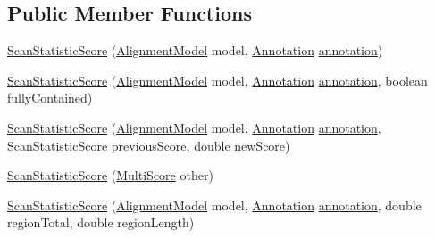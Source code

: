 \subsection*{Public Member Functions}
\begin{DoxyCompactItemize}
\item 
\hyperlink{classumms_1_1core_1_1model_1_1score_1_1_scan_statistic_score_aa144af17481662d4c3e8b2e562b1b91b}{Scan\+Statistic\+Score} (\hyperlink{classumms_1_1core_1_1model_1_1_alignment_model}{Alignment\+Model} model, \hyperlink{interfaceumms_1_1core_1_1annotation_1_1_annotation}{Annotation} \hyperlink{classumms_1_1core_1_1model_1_1score_1_1_window_score_1_1_abstract_window_score_a455fb02f18f492e611113b9da0a24888}{annotation})
\item 
\hyperlink{classumms_1_1core_1_1model_1_1score_1_1_scan_statistic_score_a2ce362a90f26940470dc5341a904265e}{Scan\+Statistic\+Score} (\hyperlink{classumms_1_1core_1_1model_1_1_alignment_model}{Alignment\+Model} model, \hyperlink{interfaceumms_1_1core_1_1annotation_1_1_annotation}{Annotation} \hyperlink{classumms_1_1core_1_1model_1_1score_1_1_window_score_1_1_abstract_window_score_a455fb02f18f492e611113b9da0a24888}{annotation}, boolean fully\+Contained)
\item 
\hyperlink{classumms_1_1core_1_1model_1_1score_1_1_scan_statistic_score_a9b1cdb78a8514b350e3d90302114cb6c}{Scan\+Statistic\+Score} (\hyperlink{classumms_1_1core_1_1model_1_1_alignment_model}{Alignment\+Model} model, \hyperlink{interfaceumms_1_1core_1_1annotation_1_1_annotation}{Annotation} \hyperlink{classumms_1_1core_1_1model_1_1score_1_1_window_score_1_1_abstract_window_score_a455fb02f18f492e611113b9da0a24888}{annotation}, \hyperlink{classumms_1_1core_1_1model_1_1score_1_1_scan_statistic_score}{Scan\+Statistic\+Score} previous\+Score, double new\+Score)
\item 
\hyperlink{classumms_1_1core_1_1model_1_1score_1_1_scan_statistic_score_a2395419532a1aad94301d88ec0f98122}{Scan\+Statistic\+Score} (\hyperlink{classumms_1_1core_1_1model_1_1score_1_1_multi_score}{Multi\+Score} other)
\item 
\hyperlink{classumms_1_1core_1_1model_1_1score_1_1_scan_statistic_score_a3b8f9c31d40e3bc174a3c8f2b04c8d07}{Scan\+Statistic\+Score} (\hyperlink{classumms_1_1core_1_1model_1_1_alignment_model}{Alignment\+Model} model, \hyperlink{interfaceumms_1_1core_1_1annotation_1_1_annotation}{Annotation} \hyperlink{classumms_1_1core_1_1model_1_1score_1_1_window_score_1_1_abstract_window_score_a455fb02f18f492e611113b9da0a24888}{annotation}, double region\+Total, double region\+Length)

\end{DoxyCompactItemize}
